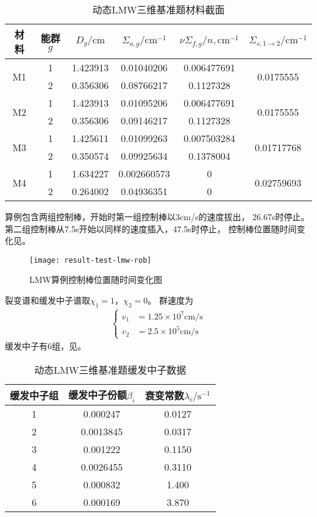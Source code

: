 \begin{table}
\centering
\caption{\label{tab:result.test.lmw.mat}动态LMW三维基准题材料截面}
\begin{tabular}{cccccc}
\toprule
材料 & 能群$g$ & $D_g/\mathrm{cm}$ & $\Sigma_{a,g}/\mathrm{cm}^{-1}$
    & $\nu\Sigma_{f,g}/n,\mathrm{cm}^{-1}$
    & $\Sigma_{s,1\rightarrow2}/\mathrm{cm}^{-1}$\\
\midrule
\multirow{2}{*}{M1} 
  & 1 & 1.423913 & 0.01040206 & 0.006477691 & \multirow{2}{*}{0.0175555} \\
  & 2 & 0.356306 & 0.08766217 & 0.1127328 &\\
\multirow{2}{*}{M2} 
  & 1 & 1.423913 & 0.01095206 & 0.006477691 & \multirow{2}{*}{0.0175555} \\
  & 2 & 0.356306 & 0.09146217 & 0.1127328 &\\
\multirow{2}{*}{M3} 
  & 1 & 1.425611 & 0.01099263 & 0.007503284 & \multirow{2}{*}{0.01717768} \\
  & 2 & 0.350574 & 0.09925634 & 0.1378004 &\\
\multirow{2}{*}{M4} 
  & 1 & 1.634227 & 0.002660573 & 0 & \multirow{2}{*}{0.02759693} \\
  & 2 & 0.264002 & 0.04936351 & 0 &\\
\bottomrule
\end{tabular}
\end{table}


算例包含两组控制棒，开始时第一组控制棒以3cm/s的速度拔出，
26.67s时停止。第二组控制棒从7.5s开始以同样的速度插入，47.5s时停止，
控制棒位置随时间变化见。
\begin{figure}
\centering
\texttt{[image: result-test-lmw-rob]}
\caption{\label{fig:result.test.lmw.rob}LMW算例控制棒位置随时间变化图}
\end{figure}

裂变谱和缓发中子谱取$\chi_1=1$，$\chi_2=0$。
群速度为
\begin{align}
  \left\{
  \begin{aligned}
  v_1&=1.25\times10^7\mathrm{cm/s}\\
  v_2&=2.5\times10^5\mathrm{cm/s}
  \end{aligned}
  \right.
\end{align}
缓发中子有6组，见。

\begin{table}
\centering
\caption{\label{tab:result.test.lmw.mat.c}动态LMW三维基准题缓发中子数据}
\begin{tabular}{ccc}
\toprule
缓发中子组 & 缓发中子份额$\beta_i$ & 衰变常数$\lambda_i/\mathrm{s}^{-1}$\\
\midrule
1 & 0.000247 & 0.0127\\
2 & 0.0013845 & 0.0317\\
3 & 0.001222 & 0.1150\\
4 & 0.0026455 & 0.3110\\
5 & 0.000832 & 1.400\\
6 & 0.000169 & 3.870\\
\bottomrule
\end{tabular}
\end{table}


